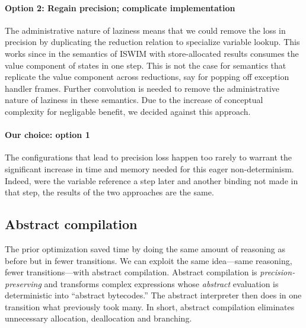 \documentclass[preprint,onecolumn,9pt]{sigplanconf} %
\begin{document}
\paragraph{Option 2: Regain precision; complicate implementation}
The administrative nature of laziness means that we could remove the
loss in precision by duplicating the reduction relation to specialize
variable lookup. This works since in the semantics of ISWIM with
store-allocated results consumes the value component of states in one
step. This is not the case for semantics that replicate the value
component across reductions, say for popping off exception handler
frames. Further convolution is needed to remove the administrative
nature of laziness in these semantics. Due to the increase of
conceptual complexity for negligable benefit, we decided against this
approach.

\paragraph{Our choice: option 1}
The configurations that lead to precision loss happen too rarely to
warrant the significant increase in time and memory needed for this
eager non-determinism. Indeed, were the variable reference a step
later and another binding not made in that step, the results of the
two approaches are the same.


\subsection{Abstract compilation}

The prior optimization saved time by doing the same amount of
reasoning as before but in fewer transitions. We can exploit the same
idea---same reasoning, fewer transitions---with abstract
compilation. Abstract compilation is \emph{precision-preserving} and
transforms complex expressions whose \emph{abstract} evaluation is
deterministic into ``abstract bytecodes.''  The abstract interpreter
then does in one transition what previously took many. In short, abstract
compilation eliminates unnecessary allocation, deallocation and
branching.
\end{document}
